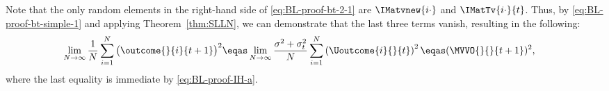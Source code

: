 \begin{enumerate}[label=(\alph*)]
\begin{equation}
        \end{equation}
        Note that the only random elements in the right-hand side of \eqref{eq:BL-proof-bt-2-1} are $\IMatvnew{i \cdot}$ and $\IMatTv{i \cdot}{t}$. Thus, by \eqref{eq:BL-proof-bt-simple-1} and applying Theorem~\ref{thm:SLLN}, we can demonstrate that the last three terms vanish, resulting in the following:
        \begin{align}
            \label{eq:BL-proof-bt-2-result}
            \lim_{N \rightarrow \infty}
            \frac{1}{N}
            \sum_{i=1}^N
            \big(
            \outcome{}{i}{t+1}
            \big)^2
            &\eqas
            \lim_{N \rightarrow \infty} \frac{\sigma^2+\sigma_t^2}{N}
            \sum_{i=1}^N
            \left(\Uoutcome{i}{}{t}\right)^2
            \eqas
            (\MVVO{}{}{t+1})^2,
        \end{align}
        where the last equality is immediate by \eqref{eq:BL-proof-IH-a}.
        

\end{enumerate}
